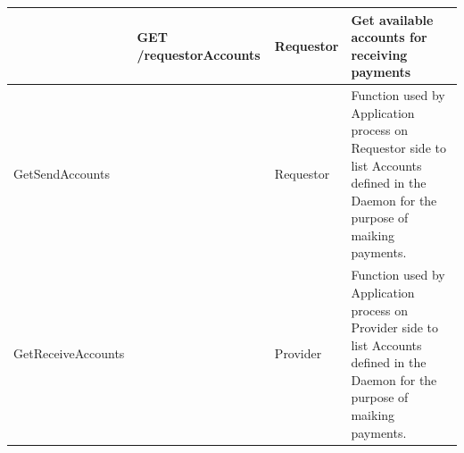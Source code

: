\begin{enumerate}
\begin{enumerate}
\begin{table}
\begin{center}
\begin{tabular}{|p{3cm}|p{7cm}|p{1.5cm}|p{4cm}|}
						&	GET /requestorAccounts						&	Requestor 	&	Get available accounts for receiving payments \\
\hline

GetSendAccounts			&												&	Requestor 	&	Function used by Application process on Requestor side to
																							list Accounts defined in the Daemon for the purpose of maiking payments. \\
\hline

GetReceiveAccounts		&												&	Provider 	&	Function used by Application process on Provider side to
																							list Accounts defined in the Daemon for the purpose of maiking payments. \\
\hline
						
\end{tabular}
\end{center}

\end{table}

\end{enumerate}

\end{enumerate} 











